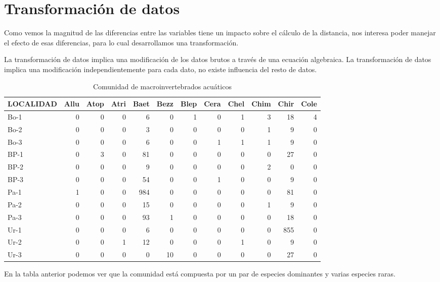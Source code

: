 \documentclass[]{book}
\begin{document}
\section{Transformación de datos}\label{transformacion-de-datos}

Como vemos la magnitud de las diferencias entre las variables tiene un
impacto sobre el cálculo de la distancia, nos interesa poder manejar el
efecto de esas diferencias, para lo cual desarrollamos una
transformación.

La transformación de datos implica una modificación de los datos brutos
a través de una ecuación algebraica. La transformación de datos implica
una modificación independientemente para cada dato, no existe influencia
del resto de datos.

\begin{table}[t]

\caption{\label{tab:unnamed-chunk-15}Comunidad de macroinvertebrados acuáticos}
\centering
\begin{tabular}{l|r|r|r|r|r|r|r|r|r|r|r}
\hline
LOCALIDAD & Allu & Atop & Atri & Baet & Bezz & Blep & Cera & Chel & Chim & Chir & Cole\\
\hline
Bo-1 & 0 & 0 & 0 & 6 & 0 & 1 & 0 & 1 & 3 & 18 & 4\\
\hline
Bo-2 & 0 & 0 & 0 & 3 & 0 & 0 & 0 & 0 & 1 & 9 & 0\\
\hline
Bo-3 & 0 & 0 & 0 & 6 & 0 & 0 & 1 & 1 & 1 & 9 & 0\\
\hline
BP-1 & 0 & 3 & 0 & 81 & 0 & 0 & 0 & 0 & 0 & 27 & 0\\
\hline
BP-2 & 0 & 0 & 0 & 9 & 0 & 0 & 0 & 0 & 2 & 0 & 0\\
\hline
BP-3 & 0 & 0 & 0 & 54 & 0 & 0 & 1 & 0 & 0 & 9 & 0\\
\hline
Pa-1 & 1 & 0 & 0 & 984 & 0 & 0 & 0 & 0 & 0 & 81 & 0\\
\hline
Pa-2 & 0 & 0 & 0 & 15 & 0 & 0 & 0 & 0 & 1 & 9 & 0\\
\hline
Pa-3 & 0 & 0 & 0 & 93 & 1 & 0 & 0 & 0 & 0 & 18 & 0\\
\hline
Ur-1 & 0 & 0 & 0 & 6 & 0 & 0 & 0 & 0 & 0 & 855 & 0\\
\hline
Ur-2 & 0 & 0 & 1 & 12 & 0 & 0 & 0 & 1 & 0 & 9 & 0\\
\hline
Ur-3 & 0 & 0 & 0 & 0 & 10 & 0 & 0 & 0 & 0 & 27 & 0\\
\hline
\end{tabular}
\end{table}

En la tabla anterior podemos ver que la comunidad está compuesta por un
par de especies dominantes y varias especies raras.
\end{document}
